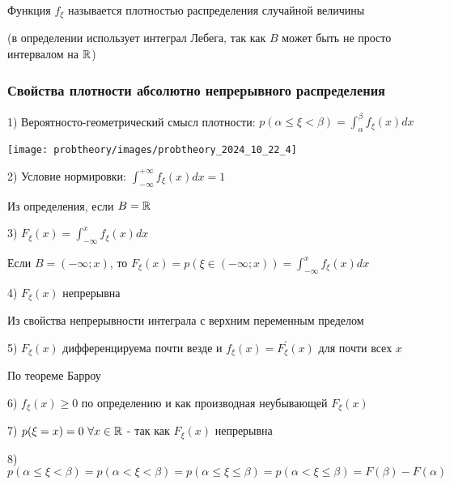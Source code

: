 \documentclass[12pt]{article}
\begin{document}
    Функция $f_\xi$ называется плотностью распределения случайной величины

    (в определении использует интеграл Лебега, так как $B$ может быть не просто интервалом на $\mathbb{R}$)

    \hypertarget{densityfunctionproperties}{}

    \subsubsection{Свойства плотности абсолютно непрерывного распределения}

    1) Вероятносто-геометрический смысл плотности: $p(\alpha \leq \xi < \beta) = \int_{\alpha}^\beta f_\xi(x) dx$

    \texttt{[image: probtheory/images/probtheory\_2024\_10\_22\_4]}

    2) Условие нормировки: $\int_{-\infty}^{+\infty} f_\xi(x)dx = 1$

    \begin{MyProof}
        Из определения, если $B = \mathbb{R}$
    \end{MyProof}

    3) $F_\xi(x) = \int_{-\infty}^x f_\xi(x)dx$

    \begin{MyProof}
        Если $B = (-\infty; x)$, то $F_\xi(x) = p(\xi \in (-\infty; x)) = \int_{-\infty}^x f_\xi(x)dx$
    \end{MyProof}

    4) $F_\xi(x)$ непрерывна 
    
    \begin{MyProof}
        Из свойства непрерывности интеграла с верхним переменным пределом
    \end{MyProof}

    5) $F_\xi(x)$ дифференцируема почти везде и $f_\xi(x) = F^\prime_\xi(x)$ для почти всех $x$
    
    \begin{MyProof}
        По теореме Барроу
    \end{MyProof}

    6) $f_\xi(x) \geq 0$ по определению и как производная неубывающей $F_\xi(x)$

    7) $p(\xi = x) = 0 \ \forall x \in \mathbb{R}$ - так как $F_\xi(x)$ непрерывна

    8) $p(\alpha \leq \xi < \beta) = p(\alpha < \xi < \beta) = p(\alpha \leq \xi \leq \beta) = p(\alpha < \xi \leq \beta) = F(\beta) - F(\alpha)$
\end{document}
